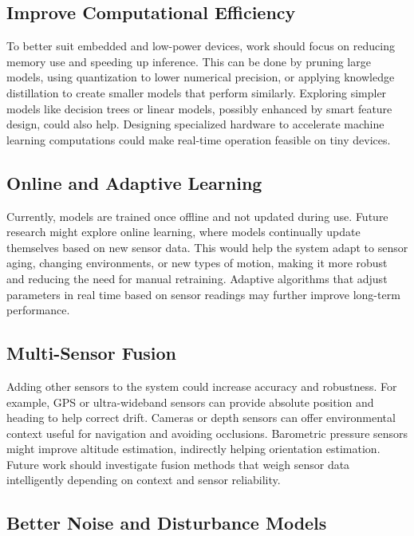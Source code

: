 \documentclass{iutbscthesis}
\begin{document}
\subsection{Improve Computational Efficiency}

To better suit embedded and low-power devices, work should focus on reducing memory use and speeding up inference. This can be done by pruning large models, using quantization to lower numerical precision, or applying knowledge distillation to create smaller models that perform similarly. Exploring simpler models like decision trees or linear models, possibly enhanced by smart feature design, could also help. Designing specialized hardware to accelerate machine learning computations could make real-time operation feasible on tiny devices.

\subsection{Online and Adaptive Learning}

Currently, models are trained once offline and not updated during use. Future research might explore online learning, where models continually update themselves based on new sensor data. This would help the system adapt to sensor aging, changing environments, or new types of motion, making it more robust and reducing the need for manual retraining. Adaptive algorithms that adjust parameters in real time based on sensor readings may further improve long-term performance.

\subsection{Multi-Sensor Fusion}

Adding other sensors to the system could increase accuracy and robustness. For example, GPS or ultra-wideband sensors can provide absolute position and heading to help correct drift. Cameras or depth sensors can offer environmental context useful for navigation and avoiding occlusions. Barometric pressure sensors might improve altitude estimation, indirectly helping orientation estimation. Future work should investigate fusion methods that weigh sensor data intelligently depending on context and sensor reliability.

\subsection{Better Noise and Disturbance Models}
\end{document}
